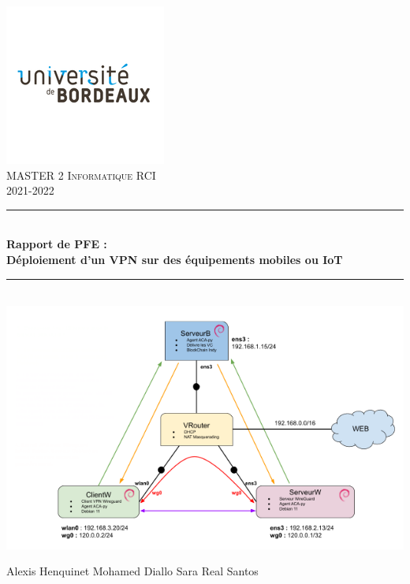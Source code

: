 \documentclass[12pt, openany]{report}
\begin{document}
\begin{titlepage}
  \begin{sffamily}
  \begin{center}
	\includegraphics[scale=0.5]{ub.png}~\\[1cm]

    \textsc{\Large MASTER 2 Informatique RCI }\\[1.5cm]
    2021-2022

    \rule{1\linewidth}{2pt}
     \\[1cm]
    { \huge \bfseries Rapport de PFE :\\
    Déploiement d'un VPN sur des équipements mobiles ou IoT\\[1cm] }
    \rule{1\linewidth}{2pt}
    \\[1cm]
    \includegraphics[scale=0.7]{topo.png}
    \\ %

   \vfill
      \begin{center}
        \Large	 Alexis Henquinet \hspace*{1cm} Mohamed Diallo \hspace*{1cm} Sara Real Santos
      \end{center}
 
 
  \end{center}
  \end{sffamily}
\end{titlepage}
\end{document}
